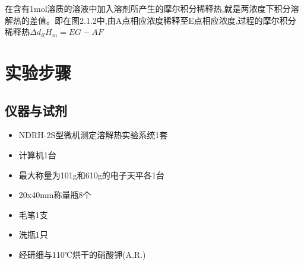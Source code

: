 \documentclass[UTF8]{ctexart}
\begin{document}
在含有1mol溶质的溶液中加入溶剂所产生的摩尔积分稀释热,就是两浓度下积分溶解热的差值。即在图2.1.2中,由A点相应浓度稀释至E点相应浓度,过程的摩尔积分稀释热$\Delta d_{il}H_m=EG-AF$

\section{实验步骤}
\subsection{仪器与试剂}
\begin{itemize}
    \item NDRH-2S型微机测定溶解热实验系统1套
    \item 计算机1台
    \item 最大称量为101g和610g的电子天平各1台
    \item 20x40mm称量瓶8个
    \item 毛笔1支
    \item 洗瓶1只
    \item 经研细与110℃烘干的硝酸钾(A.R.)
\end{itemize}
\end{document}
